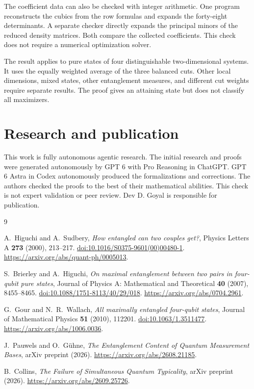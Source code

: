 \documentclass[11pt]{article}
\theoremstyle{definition}
\theoremstyle{remark}
\begin{document}
The coefficient data can also be checked with integer arithmetic. One program reconstructs the cubics from the row formulas and expands the forty-eight determinants. A separate checker directly expands the principal minors of the reduced density matrices. Both compare the collected coefficients. This check does not require a numerical optimization solver.

The result applies to pure states of four distinguishable two-dimensional systems. It uses the equally weighted average of the three balanced cuts. Other local dimensions, mixed states, other entanglement measures, and different cut weights require separate results. The proof gives an attaining state but does not classify all maximizers.

\section*{Research and publication}
This work is fully autonomous agentic research. The initial research and proofs were generated autonomously by GPT 6 with Pro Reasoning in ChatGPT. GPT 6 Astra in Codex autonomously produced the formalizations and corrections. The authors checked the proofs to the best of their mathematical abilities. This check is not expert validation or peer review. Dev D. Goyal is responsible for publication.

\begin{thebibliography}{9}

A.~Higuchi and A.~Sudbery,
\emph{How entangled can two couples get?},
Physics Letters A \textbf{273} (2000), 213--217.
\href{https://doi.org/10.1016/S0375-9601(00)00480-1}{doi:10.1016/S0375-9601(00)00480-1}.
\url{https://arxiv.org/abs/quant-ph/0005013}.

S.~Brierley and A.~Higuchi,
\emph{On maximal entanglement between two pairs in four-qubit pure states},
Journal of Physics A: Mathematical and Theoretical \textbf{40} (2007),
8455--8465.
\href{https://doi.org/10.1088/1751-8113/40/29/018}{doi:10.1088/1751-8113/40/29/018}.
\url{https://arxiv.org/abs/0704.2961}.

G.~Gour and N.~R.~Wallach,
\emph{All maximally entangled four-qubit states},
Journal of Mathematical Physics \textbf{51} (2010), 112201.
\href{https://doi.org/10.1063/1.3511477}{doi:10.1063/1.3511477}.
\url{https://arxiv.org/abs/1006.0036}.

J.~Pauwels and O.~G\"uhne,
\emph{The Entanglement Content of Quantum Measurement Bases},
arXiv preprint (2026).
\url{https://arxiv.org/abs/2608.21185}.

B.~Collins,
\emph{The Failure of Simultaneous Quantum Typicality},
arXiv preprint (2026).
\url{https://arxiv.org/abs/2609.25726}.

\end{thebibliography}
\end{document}
